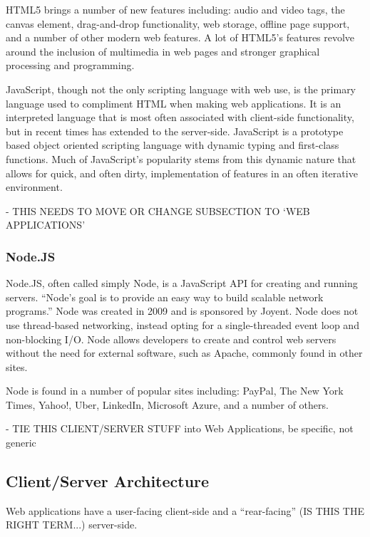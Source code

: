 \documentclass[11pt]{article}
\begin{document}
HTML5 brings a number of new features including: audio and video tags, the canvas element, drag-and-drop functionality, web storage, offline page support, and a number of other modern web features. A lot of HTML5's features revolve around the inclusion of multimedia in web pages and stronger graphical processing and programming.



JavaScript, though not the only scripting language with web use, is the primary language used to compliment HTML when making web applications. It is an interpreted language that is most often associated with client-side functionality, but in recent times has extended to the server-side. JavaScript is a prototype based object oriented scripting language with dynamic typing and first-class functions. Much of JavaScript's popularity stems from this dynamic nature that allows for quick, and often dirty, implementation of features in an often iterative environment.


- THIS NEEDS TO MOVE OR CHANGE SUBSECTION TO `WEB APPLICATIONS'
\subsubsection{Node.JS}
Node.JS, often called simply Node, is a JavaScript API for creating and running servers. ``Node's goal is to provide an easy way to build scalable network programs.'' \cite{Node} Node was created in 2009 and is sponsored by Joyent. Node does not use thread-based networking, instead opting for a single-threaded event loop and non-blocking I/O. Node allows developers to create and control web servers without the need for external software, such as Apache, commonly found in other sites.

Node is found in a number of popular sites including: PayPal, The New York Times, Yahoo!, Uber, LinkedIn, Microsoft Azure, and a number of others. \cite{Node}


- TIE THIS CLIENT/SERVER STUFF into Web Applications, be specific, not generic
\subsection{Client/Server Architecture}
Web applications have a user-facing client-side and a ``rear-facing'' (IS THIS THE RIGHT TERM...) server-side.
\end{document}
